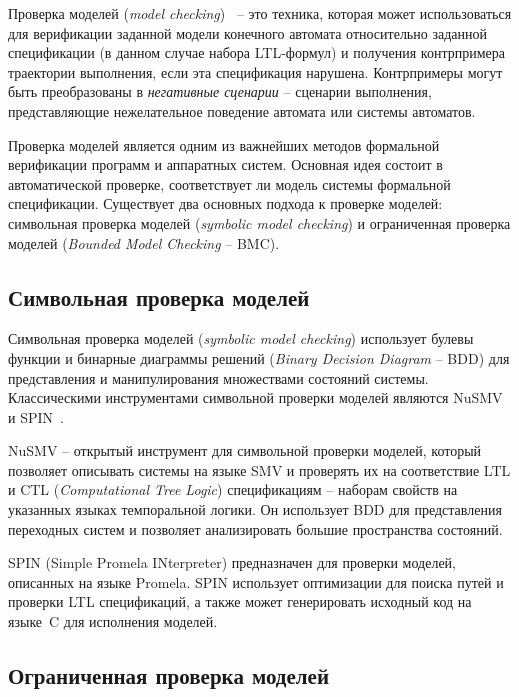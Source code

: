 Проверка моделей (\textit{model checking})~\cite{clarke1999} \--- это техника, которая может использоваться для верификации заданной модели конечного автомата относительно заданной спецификации (в данном случае набора LTL-формул) и получения контрпримера траектории выполнения, если эта спецификация нарушена.
Контрпримеры могут быть преобразованы в \textit{негативные сценарии} \--- сценарии выполнения, представляющие нежелательное поведение автомата или системы автоматов.

Проверка моделей является одним из важнейших методов формальной верификации программ и аппаратных систем.
Основная идея состоит в автоматической проверке, соответствует ли модель системы формальной спецификации.
Существует два основных подхода к проверке моделей: символьная проверка моделей (\textit{symbolic model checking}) и ограниченная проверка моделей (\textit{Bounded Model Checking} \--- BMC).


\subsection{Символьная проверка моделей}

Символьная проверка моделей (\textit{symbolic model checking}) использует булевы функции и бинарные диаграммы решений (\textit{Binary Decision Diagram} \--- BDD) для представления и манипулирования множествами состояний системы.
Классическими инструментами символьной проверки моделей являются NuSMV~\cite{nusmv} и SPIN~\cite{holzmann1997}.

NuSMV \--- открытый инструмент для символьной проверки моделей, который позволяет описывать системы на языке SMV и проверять их на соответствие LTL и CTL (\textit{Computational Tree Logic}) спецификациям \--- наборам свойств на указанных языках темпоральной логики.
Он использует BDD для представления переходных систем и позволяет анализировать большие пространства состояний.

SPIN (Simple Promela INterpreter) предназначен для проверки моделей, описанных на языке Promela.
SPIN использует оптимизации для поиска путей и проверки LTL спецификаций, а также может генерировать исходный код на языке~C для исполнения моделей.


\subsection{Ограниченная проверка моделей}

